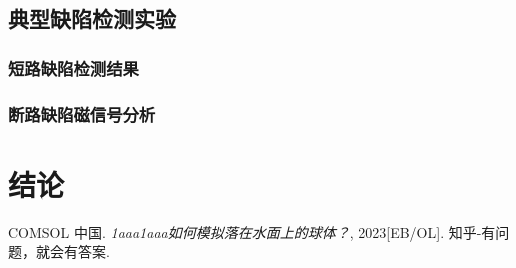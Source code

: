 \documentclass[a4paper,12pt，twoside]{ctexart}
\begin{document}
	\subsection{典型缺陷检测实验}
	\subsubsection{短路缺陷检测结果}
	\subsubsection{断路缺陷磁信号分析}
		
	
			
		
			


			


	\newpage
	\section*{结论}
	
	
	
	
	\newpage
	\begin{thebibliography}{10}  
		COMSOL 中国. \textit{1aaa}\emph{1aaa如何模拟落在水面上的球体？}, 2023[EB/OL]. 知乎-有问题，就会有答案.
		
	\end{thebibliography}
	
	
	
	
	
	
\end{document}

